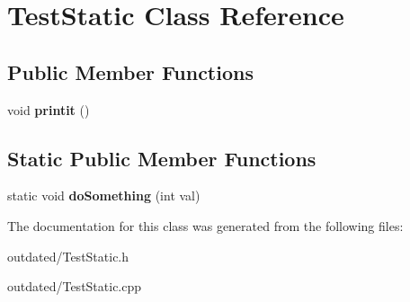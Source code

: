 \hypertarget{classTestStatic}{\section{Test\-Static Class Reference}
\label{classTestStatic}
}
\subsection*{Public Member Functions}
\begin{DoxyCompactItemize}
\item 
\hypertarget{classTestStatic_af877b62beba36ec427f5a20cf0b261e5}{void {\bfseries printit} ()}\label{classTestStatic_af877b62beba36ec427f5a20cf0b261e5}

\end{DoxyCompactItemize}
\subsection*{Static Public Member Functions}
\begin{DoxyCompactItemize}
\item 
\hypertarget{classTestStatic_af09e079b702a6fba0a9623c136665d90}{static void {\bfseries do\-Something} (int val)}\label{classTestStatic_af09e079b702a6fba0a9623c136665d90}

\end{DoxyCompactItemize}


The documentation for this class was generated from the following files\-:\begin{DoxyCompactItemize}
\item 
outdated/Test\-Static.\-h\item 
outdated/Test\-Static.\-cpp\end{DoxyCompactItemize}

